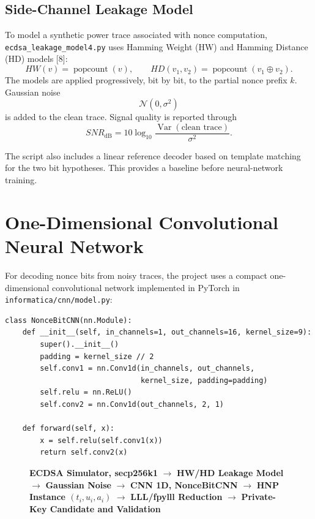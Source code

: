 \documentclass[11pt,a4paper]{article}
\begin{document}
\subsection{Side-Channel Leakage Model}

To model a synthetic power trace associated with nonce computation, \texttt{ecdsa\_leakage\_model4.py} uses Hamming Weight (HW) and Hamming Distance (HD) models [8]:
\[
HW(v)=\operatorname{popcount}(v),
\qquad
HD(v_1,v_2)=\operatorname{popcount}(v_1\oplus v_2).
\]
The models are applied progressively, bit by bit, to the partial nonce prefix $k$. Gaussian noise
\[
\mathcal N(0,\sigma^2)
\]
is added to the clean trace. Signal quality is reported through
\[
SNR_{\mathrm{dB}}
=
10\log_{10}
\frac{\operatorname{Var}(\text{clean trace})}{\sigma^2}.
\]

The script also includes a linear reference decoder based on template matching for the two bit hypotheses. This provides a baseline before neural-network training.

\section{One-Dimensional Convolutional Neural Network}

For decoding nonce bits from noisy traces, the project uses a compact one-dimensional convolutional network implemented in PyTorch in \texttt{informatica/cnn/model.py}:
\begin{verbatim}
class NonceBitCNN(nn.Module):
    def __init__(self, in_channels=1, out_channels=16, kernel_size=9):
        super().__init__()
        padding = kernel_size // 2
        self.conv1 = nn.Conv1d(in_channels, out_channels,
                               kernel_size, padding=padding)
        self.relu = nn.ReLU()
        self.conv2 = nn.Conv1d(out_channels, 2, 1)

    def forward(self, x):
        x = self.relu(self.conv1(x))
        return self.conv2(x)
\end{verbatim}

\begin{figure}[H]
\centering
\begin{minipage}{0.92\textwidth}
\centering
\textbf{ECDSA Simulator, secp256k1}
$\longrightarrow$
\textbf{HW/HD Leakage Model}
$\longrightarrow$
\textbf{Gaussian Noise}
$\longrightarrow$
\textbf{CNN 1D, NonceBitCNN}
$\longrightarrow$
\textbf{HNP Instance $(t_i,u_i,a_i)$}
$\longrightarrow$
\textbf{LLL/fpylll Reduction}
$\longrightarrow$
\textbf{Private-Key Candidate and Validation}
\end{minipage}
\end{figure}
\end{document}
